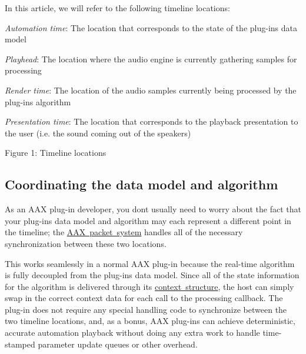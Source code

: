 In this article, we will refer to the following timeline locations\+: \begin{DoxyItemize}
\item {\itshape Automation time}\+: The location that corresponds to the state of the plug-\/in\textquotesingle{}s data model \item {\itshape Playhead}\+: The location where the audio engine is currently gathering samples for processing \item {\itshape Render time}\+: The location of the audio samples currently being processed by the plug-\/in\textquotesingle{}s algorithm \item {\itshape Presentation time}\+: The location that corresponds to the playback presentation to the user (i.\+e. the sound coming out of the speakers)\end{DoxyItemize}
 Figure 1\+: Timeline locations\hypertarget{a00821_parameterUpdateTiming_synchronization}{}\subsection{Coordinating the data model and algorithm}\label{a00821_parameterUpdateTiming_synchronization}
As an A\+AX plug-\/in developer, you don\textquotesingle{}t usually need to worry about the fact that your plug-\/in\textquotesingle{}s data model and algorithm may each represent a different point in the timeline; the \mbox{\hyperlink{a00797_alg_comm}{A\+AX packet system}} handles all of the necessary synchronization between these two locations.

This works seamlessly in a normal A\+AX plug-\/in because the real-\/time algorithm is fully decoupled from the plug-\/in\textquotesingle{}s data model. Since all of the state information for the algorithm is delivered through its \mbox{\hyperlink{a00797_alg_memmgmt}{context structure}}, the host can simply swap in the correct context data for each call to the processing callback. The plug-\/in does not require any special handling code to synchronize between the two timeline locations, and, as a bonus, A\+AX plug-\/ins can achieve deterministic, accurate automation playback without doing any extra work to handle time-\/stamped parameter update queues or other overhead.

